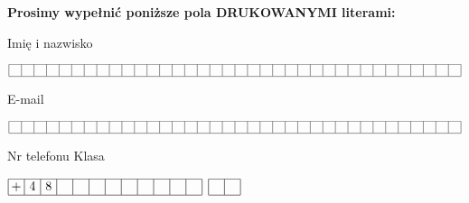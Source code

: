 \documentclass[12pt, a4paper]{article}
\begin{document}
\begin{center}
\noindent \textbf{Prosimy wypełnić poniższe pola DRUKOWANYMI literami:}
\vspace{0.5cm}
\par Imię i nazwisko
\par $\begin{array}{|c|c|c|c|c|c|c|c|c|c|c|c|c|c|c|c|c|c|c|c|c|c|c|c|c|c|c|c|c|c|c|c|c|c|c|c|}
\hline
\makebox[0.1cm]{}&\makebox[0.1cm]{}&\makebox[0.1cm]{}&\makebox[0.1cm]{}&\makebox[0.1cm]{}&\makebox[0.1cm]{}&\makebox[0.1cm]{}&\makebox[0.1cm]{}&\makebox[0.1cm]{}&\makebox[0.1cm]{}&\makebox[0.1cm]{}&\makebox[0.1cm]{}&\makebox[0.1cm]{}&\makebox[0.1cm]{}&\makebox[0.1cm]{}&\makebox[0.1cm]{}&\makebox[0.1cm]{}&\makebox[0.1cm]{}&\makebox[0.1cm]{}&\makebox[0.1cm]{}&\makebox[0.1cm]{}&\makebox[0.1cm]{}&\makebox[0.1cm]{}&\makebox[0.1cm]{}&\makebox[0.1cm]{}&\makebox[0.1cm]{}&\makebox[0.1cm]{}&\makebox[0.1cm]{}&\makebox[0.1cm]{}&\makebox[0.1cm]{}&\makebox[0.1cm]{}&\makebox[0.1cm]{}&\makebox[0.1cm]{}&\makebox[0.1cm]{}&\makebox[0.1cm]{}&\makebox[0.1cm]{}\\
\hline
\end{array}$
\vspace{0.2cm}
\par E-mail
\par $\begin{array}{|c|c|c|c|c|c|c|c|c|c|c|c|c|c|c|c|c|c|c|c|c|c|c|c|c|c|c|c|c|c|c|c|c|c|c|c|}
\hline
\makebox[0.1cm]{}&\makebox[0.1cm]{}&\makebox[0.1cm]{}&\makebox[0.1cm]{}&\makebox[0.1cm]{}&\makebox[0.1cm]{}&\makebox[0.1cm]{}&\makebox[0.1cm]{}&\makebox[0.1cm]{}&\makebox[0.1cm]{}&\makebox[0.1cm]{}&\makebox[0.1cm]{}&\makebox[0.1cm]{}&\makebox[0.1cm]{}&\makebox[0.1cm]{}&\makebox[0.1cm]{}&\makebox[0.1cm]{}&\makebox[0.1cm]{}&\makebox[0.1cm]{}&\makebox[0.1cm]{}&\makebox[0.1cm]{}&\makebox[0.1cm]{}&\makebox[0.1cm]{}&\makebox[0.1cm]{}&\makebox[0.1cm]{}&\makebox[0.1cm]{}&\makebox[0.1cm]{}&\makebox[0.1cm]{}&\makebox[0.1cm]{}&\makebox[0.1cm]{}&\makebox[0.1cm]{}&\makebox[0.1cm]{}&\makebox[0.1cm]{}&\makebox[0.1cm]{}&\makebox[0.1cm]{}&\makebox[0.1cm]{}\\
\hline
\end{array}$
\vspace{0.2cm}
\par \hspace{1.7cm} Nr telefonu \hspace{2.5cm} Klasa
\par $\begin{array}{|c|c|c|c|c|c|c|c|c|c|c|c|}
\hline
\makebox[0.1cm]{+}&\makebox[0.1cm]{4}&\makebox[0.1cm]{8}&\makebox[0.1cm]{}&\makebox[0.1cm]{}&\makebox[0.1cm]{}&\makebox[0.1cm]{}&\makebox[0.1cm]{}&\makebox[0.1cm]{}&\makebox[0.1cm]{}&\makebox[0.1cm]{}&\makebox[0.1cm]{}\\
\hline
\end{array}$
\hspace{0.2cm}
$\begin{array}{|c|c|}
\hline
\makebox[0.1cm]{}&\makebox[0.1cm]{}\\
\hline
\end{array}$
\end{center}\vspace{0.5cm}
\end{document}
